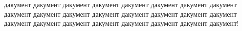 \documentclass[a4paper]{article}
\begin{document}
дакумент дакумент дакумент дакумент дакумент дакумент дакумент дакумент дакумент дакумент дакумент дакумент дакумент дакумент дакумент дакумент дакумент дакумент дакумент дакумент дакумент дакумент дакумент дакумент! 
\end{document}
